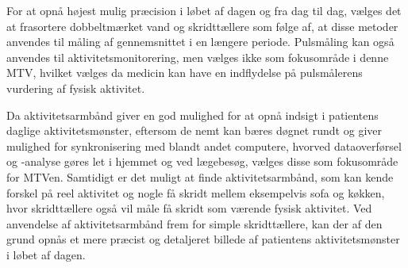 For at opnå højest mulig præcision i løbet af dagen og fra dag til dag, vælges det at frasortere dobbeltmærket vand og skridttællere som følge af, at disse metoder anvendes til måling af gennemsnittet i en længere periode. Pulsmåling kan også anvendes til aktivitetsmonitorering, men vælges ikke som fokusområde i denne MTV, hvilket vælges da medicin kan have en indflydelse på pulsmålerens vurdering af fysisk aktivitet. 

Da aktivitetsarmbånd giver en god mulighed for at opnå indsigt i patientens daglige aktivitetsmønster, eftersom de nemt kan bæres døgnet rundt og giver mulighed for synkronisering med blandt andet computere, hvorved dataoverførsel og -analyse gøres let i hjemmet og ved lægebesøg, vælges disse som fokusområde for MTVen. Samtidigt er det muligt at finde aktivitetsarmbånd, som kan kende forskel på reel aktivitet og nogle få skridt mellem eksempelvis sofa og køkken, hvor skridttællere også vil måle få skridt som værende fysisk aktivitet. Ved anvendelse af aktivitetsarmbånd frem for simple skridttællere, kan der af den grund opnås et mere præcist og detaljeret billede af patientens aktivitetsmønster i løbet af dagen.
